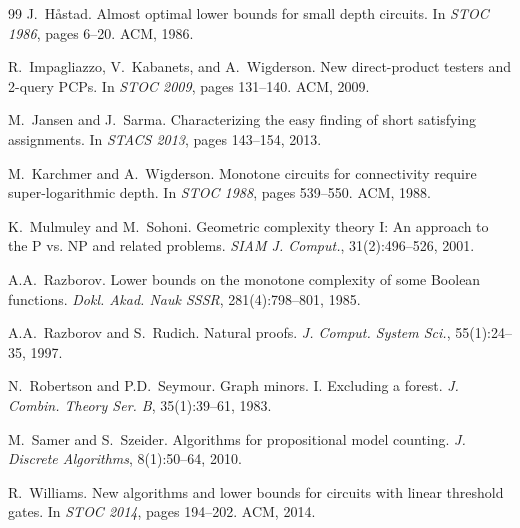 \documentclass[11pt]{article}
\theoremstyle{plain}
\theoremstyle{definition}
\begin{document}
\begin{thebibliography}{99}
J.~H\aa stad.
Almost optimal lower bounds for small depth circuits.
In \textit{STOC 1986}, pages 6--20. ACM, 1986.

R.~Impagliazzo, V.~Kabanets, and A.~Wigderson.
New direct-product testers and 2-query PCPs.
In \textit{STOC 2009}, pages 131--140. ACM, 2009.

M.~Jansen and J.~Sarma.
Characterizing the easy finding of short satisfying assignments.
In \textit{STACS 2013}, pages 143--154, 2013.

M.~Karchmer and A.~Wigderson.
Monotone circuits for connectivity require super-logarithmic depth.
In \textit{STOC 1988}, pages 539--550. ACM, 1988.

K.~Mulmuley and M.~Sohoni.
Geometric complexity theory I: An approach to the P vs. NP and related problems.
\textit{SIAM J. Comput.}, 31(2):496--526, 2001.

A.A.~Razborov.
Lower bounds on the monotone complexity of some Boolean functions.
\textit{Dokl. Akad. Nauk SSSR}, 281(4):798--801, 1985.

A.A.~Razborov and S.~Rudich.
Natural proofs.
\textit{J. Comput. System Sci.}, 55(1):24--35, 1997.

N.~Robertson and P.D.~Seymour.
Graph minors. I. Excluding a forest.
\textit{J. Combin. Theory Ser. B}, 35(1):39--61, 1983.

M.~Samer and S.~Szeider.
Algorithms for propositional model counting.
\textit{J. Discrete Algorithms}, 8(1):50--64, 2010.

R.~Williams.
New algorithms and lower bounds for circuits with linear threshold gates.
In \textit{STOC 2014}, pages 194--202. ACM, 2014.

\end{thebibliography}
\end{document}
